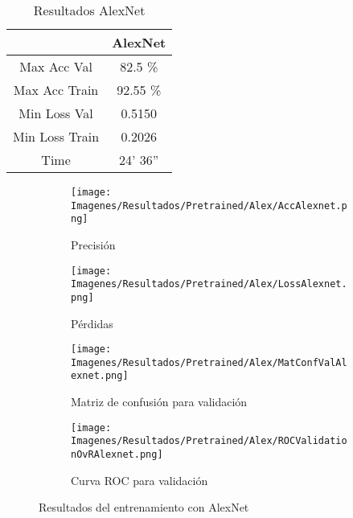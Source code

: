 \documentclass{report}
\begin{document}
\begin{table}[H]
\centering
\begin{tabular}{|c|c|}
\hline
\cellcolor[HTML]{FFFFFF}{\color[HTML]{000000} Modelo} & AlexNet \\ \hline
Max Acc Val                                           &  82.5 \%      \\ \hline
Max Acc Train                                         &  92.55 \%    \\ \hline
Min Loss Val                                          &  0.5150       \\ \hline
Min Loss Train                                        &  0.2026       \\ \hline
Time                                                  &  24' 36''   \\ \hline
\end{tabular}
\caption{Resultados AlexNet}
\label{tab:RAlexNet}
\end{table}


\vspace{0.4cm}
\begin{figure}[H]
	 	\centering
	 	\begin{subfigure}[b]{0.45\linewidth}
	 	\centering
	 		\texttt{[image: Imagenes/Resultados/Pretrained/Alex/AccAlexnet.png]}
	 		\caption{ Precisión }
                    \label{fig:AlexPrecision}
	 	\end{subfigure}
	 	\begin{subfigure}[b]{0.45\linewidth}
	 	\centering
	 		\texttt{[image: Imagenes/Resultados/Pretrained/Alex/LossAlexnet.png]}
                    \caption{ Pérdidas }
                    \label{fig:AlexnetLoss}
	 	\end{subfigure}
	 	\centering
	 	\begin{subfigure}[b]{0.45\linewidth}
	 	\centering
	 		\texttt{[image: Imagenes/Resultados/Pretrained/Alex/MatConfValAlexnet.png]}
	 		\caption{ Matriz de confusión para validación }
                    \label{fig:AlexnetMatConf}
	 	\end{subfigure}
	 	\centering
	 	\begin{subfigure}[b]{0.45\linewidth}
	 	\centering
	 		\texttt{[image: Imagenes/Resultados/Pretrained/Alex/ROCValidationOvRAlexnet.png]}
	 		\caption{ Curva ROC para validación }
                    \label{fig:AlexnetCurvaROC}
	 	\end{subfigure}
	 	\caption{ Resultados del entrenamiento con AlexNet}
	 	\label{fig:RAlexNet}
\end{figure}
\end{document}
